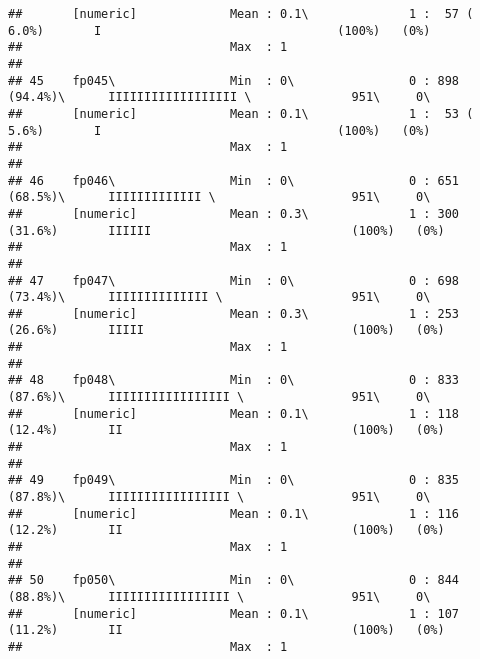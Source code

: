 \documentclass[]{article}
\begin{document}
\begin{verbatim}
##       [numeric]             Mean : 0.1\              1 :  57 ( 6.0%)       I                                 (100%)   (0%)     
##                             Max  : 1                                                                                           
## 
## 45    fp045\                Min  : 0\                0 : 898 (94.4%)\      IIIIIIIIIIIIIIIIII \              951\     0\       
##       [numeric]             Mean : 0.1\              1 :  53 ( 5.6%)       I                                 (100%)   (0%)     
##                             Max  : 1                                                                                           
## 
## 46    fp046\                Min  : 0\                0 : 651 (68.5%)\      IIIIIIIIIIIII \                   951\     0\       
##       [numeric]             Mean : 0.3\              1 : 300 (31.6%)       IIIIII                            (100%)   (0%)     
##                             Max  : 1                                                                                           
## 
## 47    fp047\                Min  : 0\                0 : 698 (73.4%)\      IIIIIIIIIIIIII \                  951\     0\       
##       [numeric]             Mean : 0.3\              1 : 253 (26.6%)       IIIII                             (100%)   (0%)     
##                             Max  : 1                                                                                           
## 
## 48    fp048\                Min  : 0\                0 : 833 (87.6%)\      IIIIIIIIIIIIIIIII \               951\     0\       
##       [numeric]             Mean : 0.1\              1 : 118 (12.4%)       II                                (100%)   (0%)     
##                             Max  : 1                                                                                           
## 
## 49    fp049\                Min  : 0\                0 : 835 (87.8%)\      IIIIIIIIIIIIIIIII \               951\     0\       
##       [numeric]             Mean : 0.1\              1 : 116 (12.2%)       II                                (100%)   (0%)     
##                             Max  : 1                                                                                           
## 
## 50    fp050\                Min  : 0\                0 : 844 (88.8%)\      IIIIIIIIIIIIIIIII \               951\     0\       
##       [numeric]             Mean : 0.1\              1 : 107 (11.2%)       II                                (100%)   (0%)     
##                             Max  : 1                                                                                           

\end{verbatim}
\end{document}
